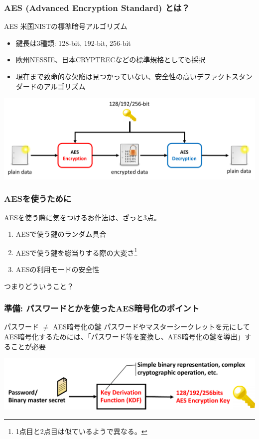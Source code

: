 \documentclass[12pt,dvipdfmx]{beamer}
\begin{document}
\begin{frame}
\frametitle{AES (Advanced Encryption Standard) とは？}
\begin{block}{AES}
米国NISTの標準暗号アルゴリズム\\
\begin{itemize}
 \item 鍵長は3種類: 128-bit, 192-bit, 256-bit
 \item 欧州NESSIE、日本CRYPTRECなどの標準規格としても採択
 \item 現在まで致命的な欠陥は見つかっていない、安全性の高い\alert{デファクトスタンダード}のアルゴリズム
\end{itemize}
\end{block}
\begin{center}
\includegraphics[width=0.9\linewidth]{Figs/aes_flow.pdf}
\end{center}
\end{frame}


\begin{frame}
\frametitle{AESを使うために}
AESを使う際に気をつけるお作法は、ざっと3点。
\begin{enumerate}
 \item AESで使う鍵の\alert{ランダム具合}
 \item AESで使う鍵を\alert{総当りする際の大変さ}\footnote[frame]{1点目と2点目は似ているようで異なる。}
 \item AESの\alert{利用モードの安全性}
\end{enumerate}

\vspace{2ex}
つまりどういうこと？

\end{frame}

\begin{frame}
\frametitle{準備: パスワードとかを使ったAES暗号化のポイント}
\begin{block}{\small パスワード $\neq$ AES暗号化の鍵}
パスワードやマスターシークレットを元にしてAES暗号化するためには、「パスワード等を変換し、AES暗号化の鍵を導出」することが必要
\end{block}
\begin{center}
\includegraphics[width=\linewidth]{Figs/kdf_definition.pdf}
\end{center}
\end{frame}
\end{document}
